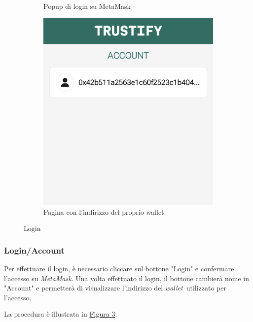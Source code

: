 \begin{figure}[H]
\begin{subfigure}[t]{0.32\textwidth}
    \caption{Popup di login su MetaMask}\label{fig:login_metamask}
    \end{subfigure}
    \centering
    \begin{subfigure}[t]{0.32\textwidth}
    \centering
    \includegraphics[width=0.9\linewidth]{src/img/account.png}
      \caption{Pagina con l'indirizzo del proprio wallet}\label{fig:account}
    \end{subfigure}

    \caption{Login}\label{fig:login}
\end{figure}
\subsubsection{Login/Account}
Per effettuare il login, è necessario cliccare sul bottone "Login" e confermare l'accesso su \textit{MetaMask}. Una volta effettuato il login, il bottone cambierà nome in "Account" e permetterà di visualizzare l'indirizzo del \textit{wallet}\glo\ utilizzato per l'accesso.

La procedura è illustrata in \hyperref[fig:login]{Figura 3}.
